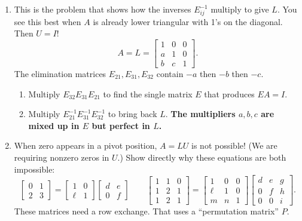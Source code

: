 \documentclass[14pt, a4paper]{article}
\begin{document}
\begin{enumerate}
    \item This is the problem that shows how the inverses $E_{ij}^{-1}$ multiply to give $L$. You see this best when $A$ is already lower triangular with 1's on the diagonal. Then $U = I$!
          \[
              A = L = \begin{bmatrix}
                  1 & 0 & 0 \\
                  a & 1 & 0 \\
                  b & c & 1
              \end{bmatrix}.
          \]
          The elimination matrices $E_{21}, E_{31}, E_{32}$ contain $-a$ then $-b$ then $-c$.
          \begin{enumerate}
              \item Multiply $E_{32}E_{31}E_{21}$ to find the single matrix $E$ that produces $EA = I$.
              \item Multiply $E_{21}^{-1}E_{31}^{-1}E_{32}^{-1}$ to bring back $L$.
                    \textbf{The multipliers $a,b,c$ are mixed up in $E$ but perfect in $L$.}
          \end{enumerate}

    \item When zero appears in a pivot position, $A = LU$ is not possible! (We are requiring nonzero zeros in $U$.) Show directly why these equations are both impossible:
          \[
              \begin{bmatrix}
                  0 & 1 \\ 2 & 3
              \end{bmatrix}
              =
              \begin{bmatrix}
                  1 & 0 \\ \ell & 1
              \end{bmatrix}
              \begin{bmatrix}
                  d & e \\ 0 & f
              \end{bmatrix}
              \qquad
              \begin{bmatrix}
                  1 & 1 & 0 \\ 1 & 2 & 1 \\ 1 & 2 & 1
              \end{bmatrix}
              =
              \begin{bmatrix}
                  1 & 0 & 0 \\ \ell & 1 & 0 \\ m & n & 1
              \end{bmatrix}
              \begin{bmatrix}
                  d & e & g \\ 0 & f & h \\ 0 & 0 & i
              \end{bmatrix}.
          \]
          These matrices need a row exchange. That uses a ``permutation matrix'' $P$.


\end{enumerate}
\end{document}
